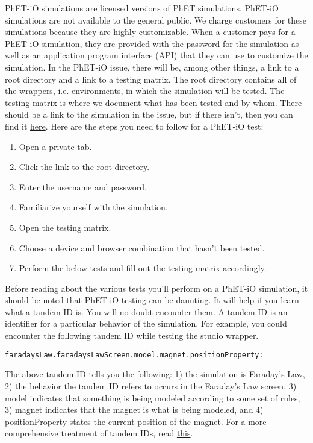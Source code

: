 \documentclass[titlepage]{article}
\begin{document}
PhET-iO simulations are licensed versions of PhET simulations. PhET-iO simulations are not available to the general public. We charge customers for these simulations because they are highly customizable. When a customer pays for a PhET-iO simulation, they are provided with the password for the simulation as well as an application program interface (API) that they can use to customize the simulation. In the PhET-iO issue, there will be, among other things, a link to a root directory and a link to a testing matrix. The root directory contains all of the wrappers, i.e. environments, in which the simulation will be tested. The testing matrix is where we document what has been tested and by whom. There should be a link to the simulation in the issue, but if there isn't, then you can find it \href{https://phet-dev.colorado.edu/html/}{here}. Here are the steps you need to follow for a PhET-iO test:

		\begin{enumerate}
			\item Open a private tab.
			\item Click the link to the root directory.
			\item Enter the username and password.
			\item Familiarize yourself with the simulation.
			\item Open the testing matrix.
			\item Choose a device and browser combination that hasn't been tested.
			\item Perform the below tests and fill out the testing matrix accordingly.
		\end{enumerate}

Before reading about the various tests you'll perform on a PhET-iO simulation, it should be noted that PhET-iO testing can be daunting. It will help if you learn what a tandem ID is. You will no doubt encounter them. A tandem ID is an identifier for a particular behavior of the simulation. For example, you could encounter the following tandem ID while testing the studio wrapper.
\begin{verbatim}
faradaysLaw.faradaysLawScreen.model.magnet.positionProperty:
\end{verbatim}
The above tandem ID tells you the following: 1) the simulation is Faraday's Law, 2) the behavior the tandem ID refers to occurs in the Faraday's Law screen, 3) model indicates that something is being modeled according to some set of rules, 3) magnet indicates that the magnet is what is being modeled, and 4) positionProperty states the current position of the magnet. For a more comprehensive treatment of tandem IDs, read \href{https://docs.google.com/document/d/1Fr-B66SD-6Xt7egNv9ZeSXdcsK6k8Lkc0nqR853_eJ4/edit#heading=h.oz7vdnbiq4ni}{this}.
\end{document}
